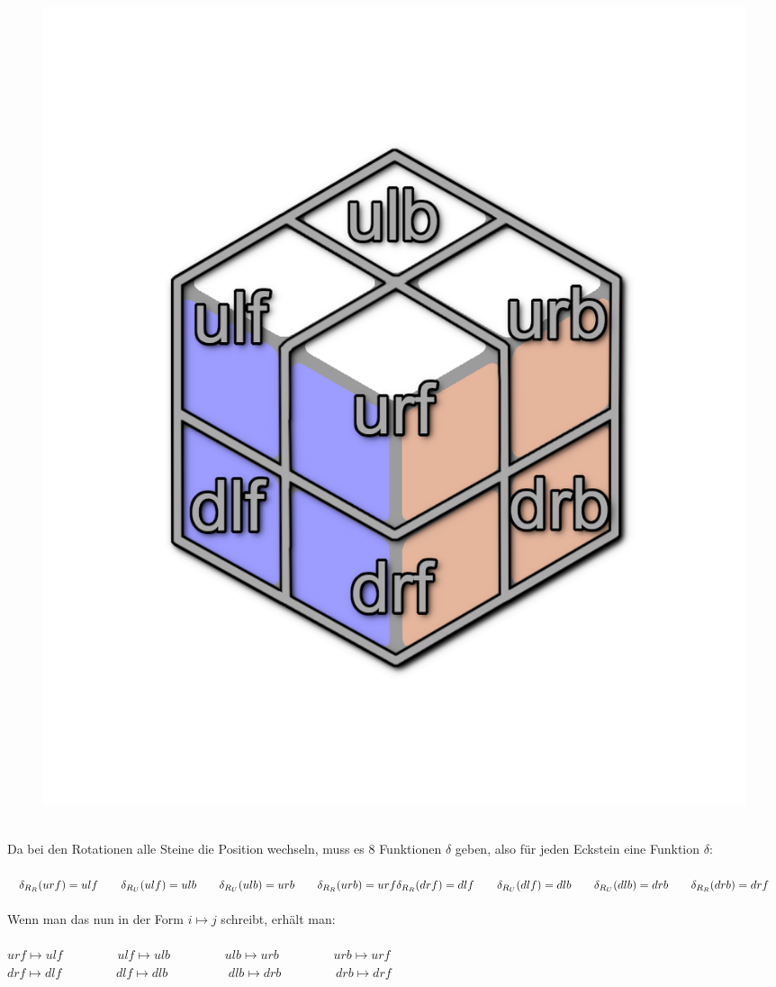 \documentclass[12pt,a4paper, usenames, dvipsnames]{scrartcl}
\begin{document}
\begin{figure}[H]
\centering
\includegraphics[scale=0.13]{auf_ulf.png}
\end{figure}
\ \\
Da bei den Rotationen alle Steine die Position wechseln, muss es 8 Funktionen $\delta$ geben, also für jeden Eckstein eine Funktion $\delta$: \\
\\
$
\delta_{R_R}(urf) = ulf \ \ \ \ \ \ \delta_{R_U}(ulf) = ulb \ \ \ \ \ \ \delta_{R_U}(ulb) = urb \ \ \ \ \ \ \delta_{R_R}(urb) = urf \\
\delta_{R_R}(drf) = dlf \ \ \ \ \ \ \delta_{R_U}(dlf) = dlb \ \ \ \ \ \ \delta_{R_U}(dlb) = drb \ \ \ \ \ \ \delta_{R_R}(drb) = drf
$
\\
\\
Wenn man das nun in der Form $i \mapsto j$ schreibt, erhält man: \\
\\
$urf \mapsto ulf$ \ \ \ \ \ \ \ \ $ulf \mapsto ulb$ \ \ \ \ \ \ \ \ $ulb \mapsto urb$ \ \ \ \ \ \ \ \ $urb \mapsto urf$ \\
$drf \mapsto dlf$ \ \ \ \ \ \ \ \ $dlf \mapsto dlb$ \ \ \ \ \ \ \ \ \ $dlb \mapsto drb$ \ \ \ \ \ \ \ \ $drb \mapsto drf$ \\
\end{document}
